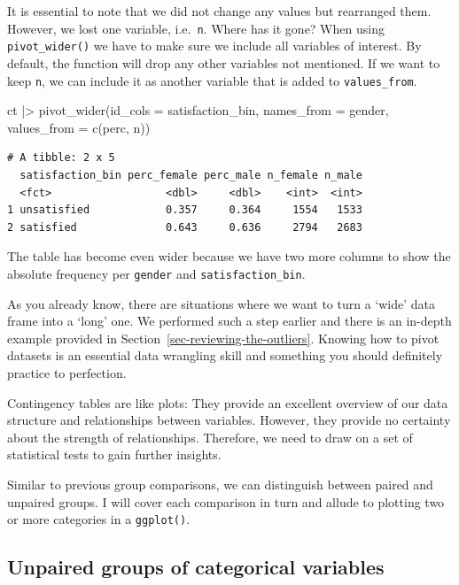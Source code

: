 \documentclass[
  letterpaper,
]{krantz}
\makeatletter
\newenvironment{Shaded}{\begin{snugshade}}{\end{snugshade}}
\newcommand{\AttributeTok}[1]{\textcolor[rgb]{0.40,0.45,0.13}{#1}}
\newcommand{\FunctionTok}[1]{\textcolor[rgb]{0.28,0.35,0.67}{#1}}
\newcommand{\NormalTok}[1]{\textcolor[rgb]{0.00,0.23,0.31}{#1}}
\newcommand{\SpecialCharTok}[1]{\textcolor[rgb]{0.37,0.37,0.37}{#1}}
\newenvironment{kframe}{%
\medskip{}
\setlength{\fboxsep}{.8em}
 \def\at@end@of@kframe{}%
 \ifinner\ifhmode%
  \def\at@end@of@kframe{\end{minipage}}%
  \begin{minipage}{\columnwidth}%
 \fi\fi%
 \def\FrameCommand##1{\hskip\@totalleftmargin \hskip-\fboxsep
 \colorbox{shadecolor}{##1}\hskip-\fboxsep
     \hskip-\linewidth \hskip-\@totalleftmargin \hskip\columnwidth}%
 \MakeFramed {\advance\hsize-\width
   \@totalleftmargin\z@ \linewidth\hsize
   \@setminipage}}%
 {\par\unskip\endMakeFramed%
 \at@end@of@kframe}
\renewenvironment{Shaded}{\begin{kframe}}{\end{kframe}}
\makeatother
\begin{document}
It is essential to note that we did not change any values but rearranged
them. However, we lost one variable, i.e.~\texttt{n}. Where has it gone?
When using \texttt{pivot\_wider()} we have to make sure we include all
variables of interest. By default, the function will drop any other
variables not mentioned. If we want to keep \texttt{n}, we can include
it as another variable that is added to \texttt{values\_from}.

\begin{Shaded}
\begin{Highlighting}[]
\NormalTok{ct }\SpecialCharTok{|\textgreater{}} \FunctionTok{pivot\_wider}\NormalTok{(}\AttributeTok{id\_cols =}\NormalTok{ satisfaction\_bin,}
                   \AttributeTok{names\_from =}\NormalTok{ gender,}
                   \AttributeTok{values\_from =} \FunctionTok{c}\NormalTok{(perc, n))}
\end{Highlighting}
\end{Shaded}

\begin{verbatim}
# A tibble: 2 x 5
  satisfaction_bin perc_female perc_male n_female n_male
  <fct>                  <dbl>     <dbl>    <int>  <int>
1 unsatisfied            0.357     0.364     1554   1533
2 satisfied              0.643     0.636     2794   2683
\end{verbatim}

The table has become even wider because we have two more columns to show
the absolute frequency per \texttt{gender} and
\texttt{satisfaction\_bin}.

As you already know, there are situations where we want to turn a `wide'
data frame into a `long' one. We performed such a step earlier and there
is an in-depth example provided in
Section~\ref{sec-reviewing-the-outliers}. Knowing how to pivot datasets
is an essential data wrangling skill and something you should definitely
practice to perfection.

Contingency tables are like plots: They provide an excellent overview of
our data structure and relationships between variables. However, they
provide no certainty about the strength of relationships. Therefore, we
need to draw on a set of statistical tests to gain further insights.

Similar to previous group comparisons, we can distinguish between paired
and unpaired groups. I will cover each comparison in turn and allude to
plotting two or more categories in a \texttt{ggplot()}.

\subsection{Unpaired groups of categorical
variables}\label{sec-unpaired-groups-categorical-variables}
\end{document}
